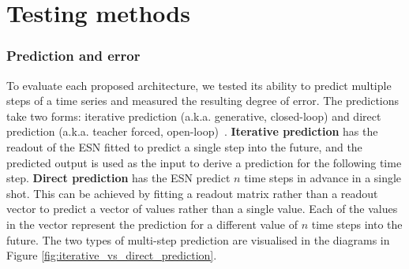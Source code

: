 
\renewcommand{\chapterlabel}{Chapter}
\chapter{Testing methods}
\label{chap:testing_methods}

\subsection{Prediction and error}

To evaluate each proposed architecture, we tested its ability to predict multiple steps of a time series and measured the resulting degree of error. The predictions take two forms: iterative prediction (a.k.a. generative, closed-loop) and direct prediction (a.k.a. teacher forced, open-loop)~\cite{lukosevicius_2012_practical_guide}. \textbf{Iterative prediction} has the readout of the ESN fitted to predict a single step into the future, and the predicted output is used as the input to derive a prediction for the following time step. \textbf{Direct prediction} has the ESN predict $n$ time steps in advance in a single shot. This can be achieved by fitting a readout matrix rather than a readout vector to predict a vector of values rather than a single value. Each of the values in the vector represent the prediction for a different value of $n$ time steps into the future. The two types of multi-step prediction are visualised in the diagrams in Figure \ref{fig:iterative_vs_direct_prediction}.

            

